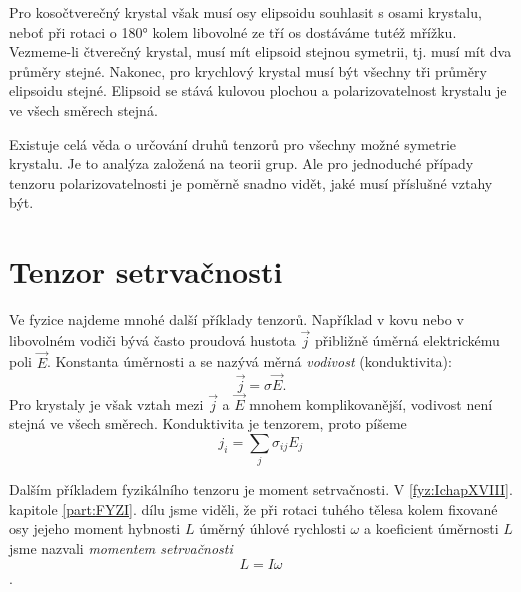     Pro kosočtverečný krystal však musí osy elipsoidu souhlasit s osami krystalu, neboť při rotaci o
    \ang{180} kolem libovolné ze tří os dostáváme tutéž mřížku. Vezmeme-li čtverečný krystal, musí
    mít elipsoid stejnou symetrii, tj. musí mít dva průměry stejné. Nakonec, pro krychlový krystal
    musí být všechny tři průměry elipsoidu stejné. Elipsoid se stává kulovou plochou a
    polarizovatelnost krystalu je ve všech směrech stejná.
    
    Existuje celá věda o určování druhů tenzorů pro všechny možné symetrie krystalu. Je to analýza
    založená na teorii grup. Ale pro jednoduché případy tenzoru polarizovatelnosti je poměrně snadno
    vidět, jaké musí příslušné vztahy být.

  \section{Tenzor setrvačnosti}\label{fyz:IIchapXXXIsecIV} 
  
    Ve fyzice najdeme mnohé další příklady tenzorů. Například v kovu nebo v libovolném vodiči bývá
    často proudová hustota \(\vec{j}\) přibližně úměrná elektrickému poli \(\vec{E}\). Konstanta
    úměrnosti a se nazývá měrná \emph{vodivost} (konduktivita):
    \begin{equation*}
      \vec{j} = \sigma\vec{E}.
    \end{equation*}
    Pro krystaly je však vztah mezi \(\vec{j}\) a \(\vec{E}\) mnohem komplikovanější, vodivost není
    stejná ve všech směrech. Konduktivita je tenzorem, proto píšeme
    \begin{equation*}
      j_i = \sum_j\sigma_{ij}E_j
    \end{equation*}

    Dalším příkladem fyzikálního tenzoru je moment setrvačnosti. V \ref{fyz:IchapXVIII}. kapitole
    \ref{part:FYZI}. dílu jsme viděli, že při rotaci tuhého tělesa kolem fixované osy jejeho moment
    hybnosti \(L\) úměrný úhlové rychlosti \(ω\) a koeficient úměrnosti \(L\) jsme nazvali
    \emph{momentem setrvačnosti} \[L=I\omega\].

